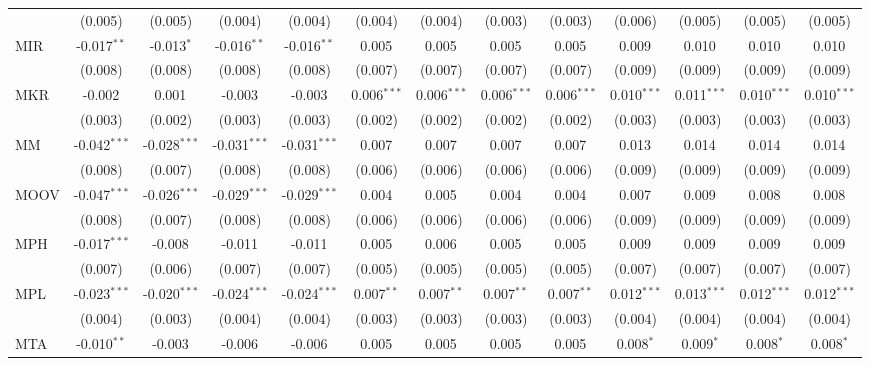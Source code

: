 \begin{table}[!htbp]
\begin{tabular}{@{\extracolsep{5pt}}lcccccccccccc}
  & (0.005) & (0.005) & (0.004) & (0.004) & (0.004) & (0.004) & (0.003) & (0.003) & (0.006) & (0.005) & (0.005) & (0.005) \\
 MIR & -0.017$^{**}$ & -0.013$^{*}$ & -0.016$^{**}$ & -0.016$^{**}$ & 0.005$^{}$ & 0.005$^{}$ & 0.005$^{}$ & 0.005$^{}$ & 0.009$^{}$ & 0.010$^{}$ & 0.010$^{}$ & 0.010$^{}$ \\
  & (0.008) & (0.008) & (0.008) & (0.008) & (0.007) & (0.007) & (0.007) & (0.007) & (0.009) & (0.009) & (0.009) & (0.009) \\
 MKR & -0.002$^{}$ & 0.001$^{}$ & -0.003$^{}$ & -0.003$^{}$ & 0.006$^{***}$ & 0.006$^{***}$ & 0.006$^{***}$ & 0.006$^{***}$ & 0.010$^{***}$ & 0.011$^{***}$ & 0.010$^{***}$ & 0.010$^{***}$ \\
  & (0.003) & (0.002) & (0.003) & (0.003) & (0.002) & (0.002) & (0.002) & (0.002) & (0.003) & (0.003) & (0.003) & (0.003) \\
 MM & -0.042$^{***}$ & -0.028$^{***}$ & -0.031$^{***}$ & -0.031$^{***}$ & 0.007$^{}$ & 0.007$^{}$ & 0.007$^{}$ & 0.007$^{}$ & 0.013$^{}$ & 0.014$^{}$ & 0.014$^{}$ & 0.014$^{}$ \\
  & (0.008) & (0.007) & (0.008) & (0.008) & (0.006) & (0.006) & (0.006) & (0.006) & (0.009) & (0.009) & (0.009) & (0.009) \\
 MOOV & -0.047$^{***}$ & -0.026$^{***}$ & -0.029$^{***}$ & -0.029$^{***}$ & 0.004$^{}$ & 0.005$^{}$ & 0.004$^{}$ & 0.004$^{}$ & 0.007$^{}$ & 0.009$^{}$ & 0.008$^{}$ & 0.008$^{}$ \\
  & (0.008) & (0.007) & (0.008) & (0.008) & (0.006) & (0.006) & (0.006) & (0.006) & (0.009) & (0.009) & (0.009) & (0.009) \\
 MPH & -0.017$^{***}$ & -0.008$^{}$ & -0.011$^{}$ & -0.011$^{}$ & 0.005$^{}$ & 0.006$^{}$ & 0.005$^{}$ & 0.005$^{}$ & 0.009$^{}$ & 0.009$^{}$ & 0.009$^{}$ & 0.009$^{}$ \\
  & (0.007) & (0.006) & (0.007) & (0.007) & (0.005) & (0.005) & (0.005) & (0.005) & (0.007) & (0.007) & (0.007) & (0.007) \\
 MPL & -0.023$^{***}$ & -0.020$^{***}$ & -0.024$^{***}$ & -0.024$^{***}$ & 0.007$^{**}$ & 0.007$^{**}$ & 0.007$^{**}$ & 0.007$^{**}$ & 0.012$^{***}$ & 0.013$^{***}$ & 0.012$^{***}$ & 0.012$^{***}$ \\
  & (0.004) & (0.003) & (0.004) & (0.004) & (0.003) & (0.003) & (0.003) & (0.003) & (0.004) & (0.004) & (0.004) & (0.004) \\
 MTA & -0.010$^{**}$ & -0.003$^{}$ & -0.006$^{}$ & -0.006$^{}$ & 0.005$^{}$ & 0.005$^{}$ & 0.005$^{}$ & 0.005$^{}$ & 0.008$^{*}$ & 0.009$^{*}$ & 0.008$^{*}$ & 0.008$^{*}$ \\

\end{tabular}
\end{table}
